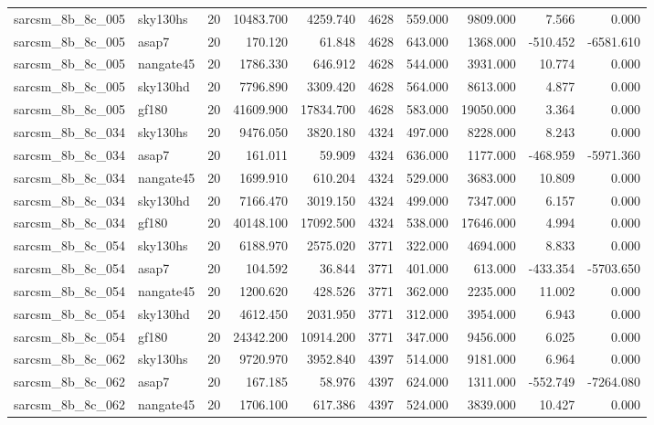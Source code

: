 \begin{tabular}{llrrrrrrrr}
sarcsm\_8b\_8c\_005 & sky130hs & 20 & 10483.700 & 4259.740 & 4628 & 559.000 & 9809.000 & 7.566 & 0.000 \\
sarcsm\_8b\_8c\_005 & asap7 & 20 & 170.120 & 61.848 & 4628 & 643.000 & 1368.000 & -510.452 & -6581.610 \\
sarcsm\_8b\_8c\_005 & nangate45 & 20 & 1786.330 & 646.912 & 4628 & 544.000 & 3931.000 & 10.774 & 0.000 \\
sarcsm\_8b\_8c\_005 & sky130hd & 20 & 7796.890 & 3309.420 & 4628 & 564.000 & 8613.000 & 4.877 & 0.000 \\
sarcsm\_8b\_8c\_005 & gf180 & 20 & 41609.900 & 17834.700 & 4628 & 583.000 & 19050.000 & 3.364 & 0.000 \\
sarcsm\_8b\_8c\_034 & sky130hs & 20 & 9476.050 & 3820.180 & 4324 & 497.000 & 8228.000 & 8.243 & 0.000 \\
sarcsm\_8b\_8c\_034 & asap7 & 20 & 161.011 & 59.909 & 4324 & 636.000 & 1177.000 & -468.959 & -5971.360 \\
sarcsm\_8b\_8c\_034 & nangate45 & 20 & 1699.910 & 610.204 & 4324 & 529.000 & 3683.000 & 10.809 & 0.000 \\
sarcsm\_8b\_8c\_034 & sky130hd & 20 & 7166.470 & 3019.150 & 4324 & 499.000 & 7347.000 & 6.157 & 0.000 \\
sarcsm\_8b\_8c\_034 & gf180 & 20 & 40148.100 & 17092.500 & 4324 & 538.000 & 17646.000 & 4.994 & 0.000 \\
sarcsm\_8b\_8c\_054 & sky130hs & 20 & 6188.970 & 2575.020 & 3771 & 322.000 & 4694.000 & 8.833 & 0.000 \\
sarcsm\_8b\_8c\_054 & asap7 & 20 & 104.592 & 36.844 & 3771 & 401.000 & 613.000 & -433.354 & -5703.650 \\
sarcsm\_8b\_8c\_054 & nangate45 & 20 & 1200.620 & 428.526 & 3771 & 362.000 & 2235.000 & 11.002 & 0.000 \\
sarcsm\_8b\_8c\_054 & sky130hd & 20 & 4612.450 & 2031.950 & 3771 & 312.000 & 3954.000 & 6.943 & 0.000 \\
sarcsm\_8b\_8c\_054 & gf180 & 20 & 24342.200 & 10914.200 & 3771 & 347.000 & 9456.000 & 6.025 & 0.000 \\
sarcsm\_8b\_8c\_062 & sky130hs & 20 & 9720.970 & 3952.840 & 4397 & 514.000 & 9181.000 & 6.964 & 0.000 \\
sarcsm\_8b\_8c\_062 & asap7 & 20 & 167.185 & 58.976 & 4397 & 624.000 & 1311.000 & -552.749 & -7264.080 \\
sarcsm\_8b\_8c\_062 & nangate45 & 20 & 1706.100 & 617.386 & 4397 & 524.000 & 3839.000 & 10.427 & 0.000 \\

\end{tabular}

